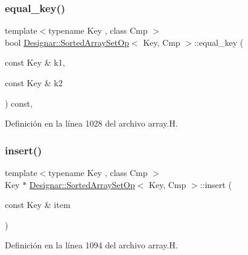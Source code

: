 \subsubsection{\texorpdfstring{equal\+\_\+key()}{equal\_key()}}
{\footnotesize\ttfamily template$<$typename Key , class Cmp $>$ \\
bool \hyperlink{class_designar_1_1_sorted_array_set_op}{Designar\+::\+Sorted\+Array\+Set\+Op}$<$ Key, Cmp $>$\+::equal\+\_\+key (\begin{DoxyParamCaption}\item[{const Key \&}]{k1,  }\item[{const Key \&}]{k2 }\end{DoxyParamCaption}) const\hspace{0.3cm}{\ttfamily [inline]}, {\ttfamily [protected]}}



Definición en la línea 1028 del archivo array.\+H.

\mbox{\label{class_designar_1_1_sorted_array_set_op_aa23273a531de4a184c6a0bdf30816c79}} 
\subsubsection{\texorpdfstring{insert()}{insert()}\hspace{0.1cm}{\footnotesize\ttfamily [1/2]}}
{\footnotesize\ttfamily template$<$typename Key , class Cmp $>$ \\
Key $\ast$ \hyperlink{class_designar_1_1_sorted_array_set_op}{Designar\+::\+Sorted\+Array\+Set\+Op}$<$ Key, Cmp $>$\+::insert (\begin{DoxyParamCaption}\item[{const Key \&}]{item }\end{DoxyParamCaption})}



Definición en la línea 1094 del archivo array.\+H.

\mbox{\label{class_designar_1_1_sorted_array_set_op_a78058ddfd47003fc67d8a87068c5fc78}} 
